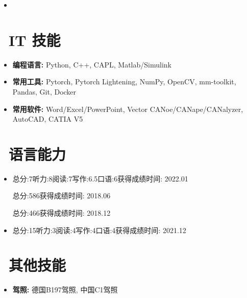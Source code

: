 \documentclass{resume}
\begin{document}
\begin{itemize}
  \item {}
\end{itemize}
\vspace{0.1cm}

\section{\faCogs\ IT 技能}
\begin{itemize}
  \item \textbf{编程语言:} Python, C++, CAPL, Matlab/Simulink
  \item \textbf{常用工具:} Pytorch, Pytorch Lightening, NumPy, OpenCV, mm-toolkit, Pandas, Git, Docker
  \item \textbf{常用软件:} Word/Excel/PowerPoint, Vector CANoe/CANape/CANalyzer, AutoCAD, CATIA V5
\end{itemize}
\vspace{0.1cm}

\section{\faLanguage\ 语言能力}
\begin{itemize}
  \item {}
  {总分:7}{听力:8}{阅读:7}{写作:6.5}{口语:6}{获得成绩时间: 2022.01}

  {总分:586}{}{}{}{}{获得成绩时间: 2018.06}

  {总分:466}{}{}{}{}{获得成绩时间: 2018.12}

  \vspace{0.1cm}
  \item {}
  {总分:15}{听力:3}{阅读:4}{写作:4}{口语:4}{获得成绩时间: 2021.12}
\end{itemize}
\vspace{0.1cm}

\section{\faWrench\ 其他技能}
\begin{itemize}
  \item \textbf{驾照:} 德国B197驾照, 中国C1驾照 
\end{itemize}
\end{document}
